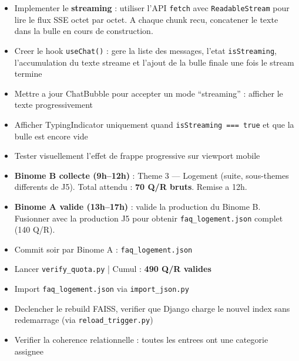\documentclass[11pt,a4paper]{article}
\begin{document}
\begin{reactbox}[Frontend --- J6]
\begin{itemize}
    \item[$\square$] Implementer le \textbf{streaming} : utiliser l'API \texttt{fetch} avec \texttt{ReadableStream} pour lire le flux SSE octet par octet. A chaque chunk recu, concatener le texte dans la bulle en cours de construction.
    \item[$\square$] Creer le hook \texttt{useChat()} : gere la liste des messages, l'etat \texttt{isStreaming}, l'accumulation du texte streame et l'ajout de la bulle finale une fois le stream termine
    \item[$\square$] Mettre a jour ChatBubble pour accepter un mode ``streaming'' : afficher le texte progressivement
    \item[$\square$] Afficher TypingIndicator uniquement quand \texttt{isStreaming === true} et que la bulle est encore vide
    \item[$\square$] Tester visuellement l'effet de frappe progressive sur viewport mobile
\end{itemize}
\end{reactbox}

\begin{databox}[Data --- J6]
\begin{itemize}
    \item[$\square$] \textbf{Binome B collecte (9h--12h)} : Theme 3 --- Logement (suite, sous-themes differents de J5). Total attendu : \textbf{70 Q/R bruts}. Remise a 12h.
    \item[$\square$] \textbf{Binome A valide (13h--17h)} : valide la production du Binome B. Fusionner avec la production J5 pour obtenir \texttt{faq\_logement.json} complet (140 Q/R).
    \item[$\square$] Commit soir par Binome A : \texttt{faq\_logement.json}
    \item[$\square$] Lancer \texttt{verify\_quota.py} | Cumul : \textbf{490 Q/R valides}
\end{itemize}
\end{databox}

\begin{dbbox}
\begin{itemize}
    \item[$\square$] Import \texttt{faq\_logement.json} via \texttt{import\_json.py}
    \item[$\square$] Declencher le rebuild FAISS, verifier que Django charge le nouvel index sans redemarrage (via \texttt{reload\_trigger.py})
    \item[$\square$] Verifier la coherence relationnelle : toutes les entrees ont une categorie assignee
\end{itemize}
\end{dbbox}
\end{document}
